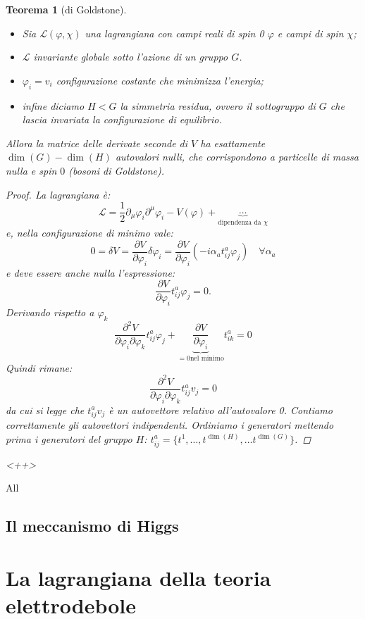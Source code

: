 \documentclass[italian,a4paper]{article}
\newtheorem*{theorem}{Teorema}
\theoremstyle{definition}
\newcommand{\lagr}{\ensuremath{\mathscr{L}}}
\begin{document}
\begin{theorem}[di Goldstone]
    \label{teorema_goldstone}
    \hspace*{\fill}
    \begin{itemize}
        \item Sia $\lagr(\varphi, \chi)$ una lagrangiana con campi reali di spin 0
    $\varphi$ e campi di spin  $\chi$;
        \item $\lagr$ invariante globale sotto l'azione di un gruppo $G$.
        \item $\varphi_i = v_i$ configurazione costante che minimizza
            l'energia;
        \item infine diciamo $H < G$ la simmetria residua, ovvero il
            sottogruppo di $G$ che lascia invariata la configurazione di
            equilibrio.
    \end{itemize}
    Allora la matrice delle derivate seconde di $V$ ha esattamente
    $\dim(G) - \dim(H)$ autovalori nulli, che corrispondono a particelle di
    massa nulla e spin $0$ (bosoni di Goldstone).
    \begin{proof}
        La lagrangiana \`e:
        \begin{equation*}
            \lagr = \dfrac{1}{2}\partial_\mu \varphi_i\partial^\mu
            \varphi_i- V(\varphi) + \underbrace{\cdots}_{\text{dipendenza da
            } \chi}
        \end{equation*}
        e, nella configurazione di minimo vale:
        \begin{equation*}
            0 = \delta V = \dfrac{\partial V}{\partial \varphi_i}\delta \varphi_i = 
            \dfrac{\partial V}{\partial \varphi_i}(-i \alpha_a
            t^a_{ij}\varphi_j) \quad \forall \alpha_a
        \end{equation*}
        e deve essere anche nulla l'espressione:
        \begin{equation*}
             \dfrac{\partial V}{\partial \varphi_i}t^a_{ij}\varphi_j = 0.
        \end{equation*}
        Derivando rispetto a $\varphi_k$
        \begin{equation*}
            \dfrac{\partial^2 V}{\partial\varphi_i
            \partial\varphi_k}t^a_{ij}\varphi_j +
            \underbrace{\dfrac{\partial V}{\partial \varphi_i}}_{=0\text{
            nel minimo}}t^a_{ik} = 0
        \end{equation*}
        Quindi rimane:
        \begin{equation*}
            \dfrac{\partial^2 V}{\partial\varphi_i
            \partial\varphi_k}t^a_{ij}v_j = 0 
        \end{equation*}
        da cui si legge che $t^a_{ij}v_j$ \`e un autovettore relativo
        all'autovalore 0. Contiamo correttamente gli autovettori indipendenti. Ordiniamo i generatori mettendo prima i
        generatori del gruppo $H$: $t^a_{ij} = \{t^1,\ldots,t^{\dim(H)},
        \ldots t^{\dim(G)} \}$.

    \end{proof}<++>
\end{theorem}
All
\subsection{Il meccanismo di Higgs}
\section{La lagrangiana della teoria elettrodebole}
\end{document}
